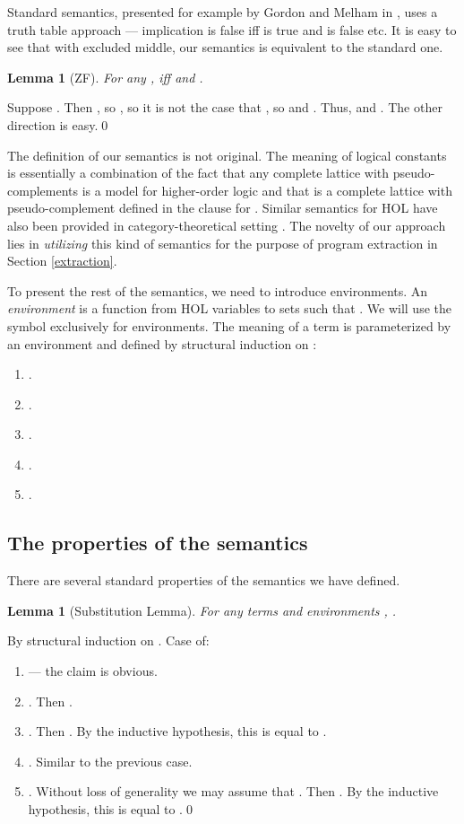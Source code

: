 \documentclass{LMCS}
\newtheorem{lemma}[thm]{Lemma}
\begin{document}
Standard semantics, presented for example by Gordon and Melham in \cite{GM93}, uses a
truth table approach --- implication  is false iff
 is true and  is false etc. It is easy to see that with excluded
middle, our semantics is equivalent to the standard one.

\begin{lemma}[ZF]
For any ,  iff  and . 
\end{lemma}
\proof
Suppose . Then , so , so it is not the
case that , so  and . Thus,  and . The other direction is easy.\qed

The definition of our semantics is not original. The meaning of logical constants is essentially a
combination of the fact that any complete lattice with pseudo-complements is a model for higher-order
logic and that  is a complete lattice with pseudo-complement defined
in the clause for  \cite{Rasiowa}. Similar semantics for HOL have also been provided in 
category-theoretical setting \cite{LS86}. The novelty of our approach lies
in \emph{utilizing} this kind of semantics for the purpose of program extraction in
Section \ref{extraction}. 

To present the rest of the semantics, we need to introduce environments. An
\emph{environment} is a function from HOL variables to sets such that
. We will use the symbol  exclusively for environments.
The meaning  of a term  is parameterized by an environment
 and defined by structural induction on :

\begin{enumerate}[]
\item . 
\item .
\item .
\item .
\item . 
\end{enumerate}

\subsection{The properties of the semantics}

There are several standard properties of the semantics we have defined. 

\begin{lemma}[Substitution Lemma]
For any terms  and environments ,  . 
\end{lemma}
\proof
By structural induction on . Case  of:
\begin{enumerate}[]
\item  --- the claim is obvious. 
\item . Then . 
\item . Then . By the inductive
hypothesis, this is equal to . 
\item . Similar to the previous case. 
\item . Without loss of generality we may assume that . Then . By the inductive
hypothesis, this is equal to .\qed
\end{enumerate}
\end{document}
